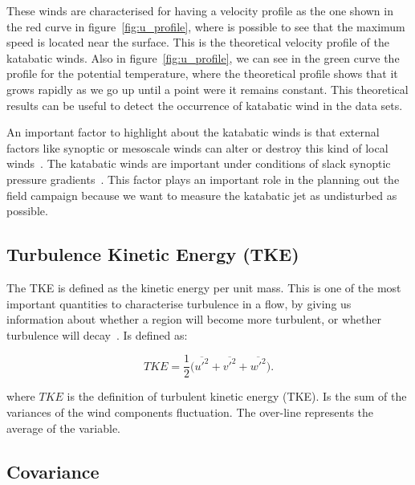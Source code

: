 These winds are characterised for having a velocity profile as the one shown in the red curve in figure~\ref{fig:u_profile}, where is possible to see that the maximum speed is located near the surface. This is the theoretical velocity profile of the katabatic winds. Also in figure~\ref{fig:u_profile}, we can see in the green curve the profile for the potential temperature, where the theoretical profile shows that it grows rapidly as we go up until a point were it remains constant. This theoretical results can be useful to detect the occurrence of katabatic wind in the data sets.

An important factor to highlight about the katabatic winds is that external factors like synoptic or mesoscale winds can alter or destroy this kind of local winds~\citep{stull2012introduction}. The katabatic winds are important under conditions of slack synoptic pressure gradients~\citep{manins1979katabatic}. This factor plays an important role in the planning out the field campaign because we want to measure the katabatic jet as undisturbed as possible.


\subsection{Turbulence Kinetic Energy (TKE)}
The TKE is defined as the kinetic energy per unit mass. This is one of the most important quantities to characterise turbulence in a flow, by giving us information about whether a region will become more turbulent, or whether turbulence will decay~\citep{stull2012introduction}.  Is defined as:

\begin{equation}
    TKE = \frac{1}{2} \big(\overline{u'^2} + \overline{v'^2} + \overline{w'^2}\big). 
    \label{eq:tke}
\end{equation}

\noindent where $TKE$ is the definition of turbulent kinetic energy (TKE). Is the sum of the variances of the wind components fluctuation. The over-line represents the average of the variable. 

\subsection{Covariance}

